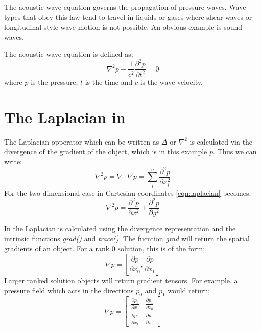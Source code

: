 
%
%
%



The acoustic wave equation governs the propagation of pressure waves. Wave
types that obey this law tend to travel in liquids or gases where shear waves
or longitudinal style wave motion is not possible. An obvious example is sound
waves.

The acoustic wave equation is defined as;
\begin{equation}
 \nabla ^2 p - \frac{1}{c^2} \frac{\partial ^2 p}{\partial t^2} = 0
\label{eqn:acswave}
\end{equation}
where $p$ is the pressure, $t$ is the time and $c$ is the wave velocity. 

\section{The Laplacian in \esc}
The Laplacian opperator which can be written as $\Delta$ or $\nabla^2$  is
calculated via the divergence of the gradient of the object, which is in this
example $p$. Thus we can write;
\begin{equation}
 \nabla^2 p = \nabla \cdot \nabla p = 
	\sum_{i}^n
	\frac{\partial^2 p}{\partial x^2_{i}}
 \label{eqn:laplacian}
\end{equation}
For the two dimensional case in Cartesian coordinates \autoref{eqn:laplacian}
becomes;
\begin{equation}
 \nabla^2 p = \frac{\partial^2 p}{\partial x^2} 
		   + \frac{\partial^2 p}{\partial y^2}
\end{equation}

In \esc the Laplacian is calculated using the divergence representation and the
intrinsic functions \textit{grad()} and \textit{trace()}. The fucntion
\textit{grad{}} will return the spatial gradients of an object.  
For a rank 0 solution, this is of the form;
\begin{equation}
 \nabla p = \left[
	   \frac{\partial p}{\partial x _{0}},  
	   \frac{\partial p}{\partial x _{1}}
                  \right]
\label{eqn:grad}
\end{equation}
Larger ranked solution objects will return gradient tensors. For example, a
pressure field which acts in the directions $p _{0}$ and $p
_{1}$ would return;
\begin{equation}
  \nabla p = \begin{bmatrix}
	   \frac{\partial p _{0}}{\partial x _{0}} &
		\frac{\partial p _{1}}{\partial x _{0}} \\
	  \frac{\partial p _{0}}{\partial x _{1}} &
		\frac{\partial p _{1}}{\partial x _{1}} 
                  \end{bmatrix}
\label{eqn:gradrank1}
\end{equation}

